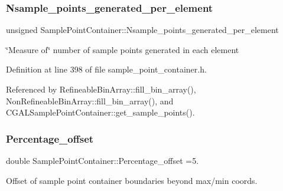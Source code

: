 \mbox{\label{classSamplePointContainer_a849e85891df1b33c5cbe65c8a1f3b4f7}} 
\subsubsection{\texorpdfstring{Nsample\+\_\+points\+\_\+generated\+\_\+per\+\_\+element}{Nsample\_points\_generated\_per\_element}}
{\footnotesize\ttfamily unsigned Sample\+Point\+Container\+::\+Nsample\+\_\+points\+\_\+generated\+\_\+per\+\_\+element\hspace{0.3cm}{\ttfamily [protected]}}



\char`\"{}\+Measure of\char`\"{} number of sample points generated in each element 



Definition at line 398 of file sample\+\_\+point\+\_\+container.\+h.



Referenced by Refineable\+Bin\+Array\+::fill\+\_\+bin\+\_\+array(), Non\+Refineable\+Bin\+Array\+::fill\+\_\+bin\+\_\+array(), and C\+G\+A\+L\+Sample\+Point\+Container\+::get\+\_\+sample\+\_\+points().

\mbox{\label{classSamplePointContainer_a13035786055416a2da9ae7eec515bccd}} 
\subsubsection{\texorpdfstring{Percentage\+\_\+offset}{Percentage\_offset}}
{\footnotesize\ttfamily double Sample\+Point\+Container\+::\+Percentage\+\_\+offset =5.\hspace{0.3cm}{\ttfamily [static]}}



Offset of sample point container boundaries beyond max/min coords. 



